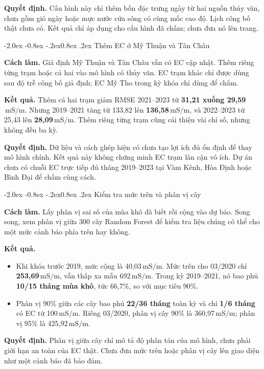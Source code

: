 \documentclass[12pt,a4paper,oneside]{report}
\makeatletter
\newcommand{\ms}{\ensuremath{\,\mathrm{mS/m}}}
\renewcommand\section{\@startsection{section}{1}{\z@}%
  {-2.0ex \@plus -0.8ex \@minus -.2ex}{0.8ex \@plus .2ex}%
  {\normalfont\large\bfseries\color{mainteal}}}
\makeatother
\begin{document}
\textbf{Quyết định.} Cấu hình này chỉ thêm bốn đặc trưng ngày từ hai nguồn thủy văn, chưa gồm gió ngày hoặc mực nước cửa sông có cùng mốc cao độ. Lịch công bố thật chưa có. Kết quả chỉ áp dụng cho cấu hình đã chấm; chưa đưa nó lên trang.

\section{Thêm EC ở Mỹ Thuận và Tân Châu}

\textbf{Cách làm.} Giả định Mỹ Thuận và Tân Châu vẫn có EC cập nhật. Thêm riêng từng trạm hoặc cả hai vào mô hình có thủy văn. EC trạm khác chỉ được dùng sau độ trễ công bố giả định; EC Mỹ Tho trong kỳ khóa chỉ dùng để chấm.

\textbf{Kết quả.} Thêm cả hai trạm giảm RMSE 2021--2023 từ \textbf{31,21 xuống 29,59\ms}. Nhưng 2019--2021 tăng từ 133,82 lên \textbf{136,58\ms}, và 2022--2023 từ 25,43 lên \textbf{28,09\ms}. Thêm riêng từng trạm cũng cải thiện vài chỉ số, nhưng không đều ba kỳ.

\textbf{Quyết định.} Dữ liệu và cách ghép hiện có chưa tạo lợi ích đủ ổn định để thay mô hình chính. Kết quả này không chứng minh EC trạm lân cận vô ích. Dự án chưa có chuỗi EC trực tiếp đủ tháng 2019--2023 tại Vàm Kênh, Hòa Định hoặc Bình Đại để chấm cùng cách.

\section{Kiểm tra mức trên và phân vị cây}

\textbf{Cách làm.} Lấy phân vị sai số của mùa khô đã biết rồi cộng vào dự báo. Song song, xem phân vị giữa 300 cây Random Forest để kiểm tra liệu chúng có thể cho một mức cảnh báo phía trên hay không.

\textbf{Kết quả.}
\begin{itemize}
  \item Khi khóa trước 2019, mức cộng là 40,03\ms. Mức trên cho 03/2020 chỉ \textbf{253,69\ms}, vẫn thấp xa mẫu 692\ms. Trong kỳ 2019--2021, nó bao phủ \textbf{10/15 tháng mùa khô}, tức 66,7\%, so với mục tiêu 90\%.
  \item Phân vị 90\% giữa các cây bao phủ \textbf{22/36 tháng} toàn kỳ và chỉ \textbf{1/6 tháng} có EC từ 100\ms. Riêng 03/2020, phân vị cây 90\% là 360,97\ms; phân vị 95\% là 425,92\ms.
\end{itemize}
\textbf{Quyết định.} Phân vị giữa cây chỉ mô tả độ phân tán của mô hình, chưa phải giới hạn an toàn của EC thật. Chưa đưa mức trên hoặc phân vị cây lên giao diện như một cảnh báo đã bảo đảm.
\end{document}

